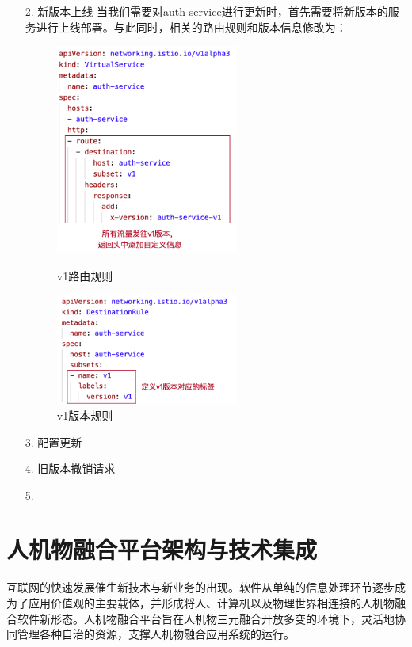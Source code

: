 \documentclass[12pt,a4paper]{article}
\begin{document}
\begin{enumerate}
	\item [2.] 新版本上线
	当我们需要对auth-service进行更新时，首先需要将新版本的服务进行上线部署。与此同时，相关的路由规则和版本信息修改为：
	\begin{figure}[htbp]
	\centering
	\begin{minipage}[t]{0.48\textwidth}
	\centering
	\centerline{\includegraphics[width=6cm]{vs_all_v1.png}}
	\caption{v1路由规则}
	\label{fig:vs_all_v1}
	\end{minipage}
	\begin{minipage}[t]{0.48\textwidth}
	\centering
	\centerline{\includegraphics[width=6cm]{dr_v1.png}}
	\caption{v1版本规则}
	\label{fig:dr_v1}
	\end{minipage}
	\end{figure}
	\item [3.] 配置更新
	\item [4.] 旧版本撤销请求
	\item [5.] 
\end{enumerate}

\newpage
\section{人机物融合平台架构与技术集成} 

互联网的快速发展催生新技术与新业务的出现。软件从单纯的信息处理环节逐步成为了应用价值观的主要载体，并形成将人、计算机以及物理世界相连接的人机物融合软件新形态。人机物融合平台旨在人机物三元融合开放多变的环境下，灵活地协同管理各种自治的资源，支撑人机物融合应用系统的运行。
\end{document}
